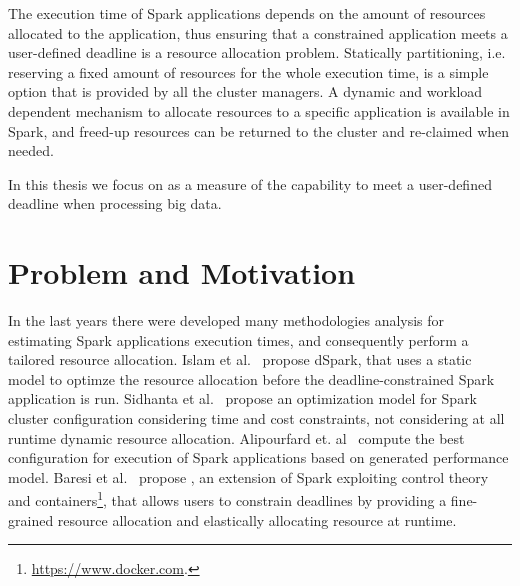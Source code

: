 
The execution time of Spark applications depends on the amount of resources allocated to the application, thus ensuring that a \qos constrained application meets a user-defined deadline is a resource allocation problem. Statically partitioning, i.e. reserving a fixed amount of resources for the whole execution time, is a simple option that is provided by all the cluster managers. A dynamic and workload dependent mechanism to allocate resources to a specific application is available in Spark, and freed-up resources can be returned to the cluster and re-claimed when needed.




In this thesis we focus on \qos as a measure of the capability to meet a user-defined deadline when processing big data.

\section{Problem and Motivation}\label{sec:problem_motivation}
In the last years there were developed many methodologies analysis for estimating Spark applications execution times, and consequently perform a tailored resource allocation. 
Islam et al.~\cite{dSpark} propose dSpark, that uses a static model to optimze the resource allocation before the deadline-constrained Spark application is run. Sidhanta et al.~\cite{Sidhanta2016} propose an optimization model for Spark cluster configuration considering time and cost constraints, not considering at all runtime dynamic resource allocation. Alipourfard et. al~\cite{Alipourfard} compute the best configuration for execution of Spark applications based on generated performance model. Baresi et al.~\cite{xsparkreport, Quattrocchi2018} propose \cSpark, an extension of Spark exploiting control theory and containers\footnote{\url{https://www.docker.com}.}, that allows users to constrain deadlines by providing a fine-grained resource allocation and elastically allocating resource at runtime.

